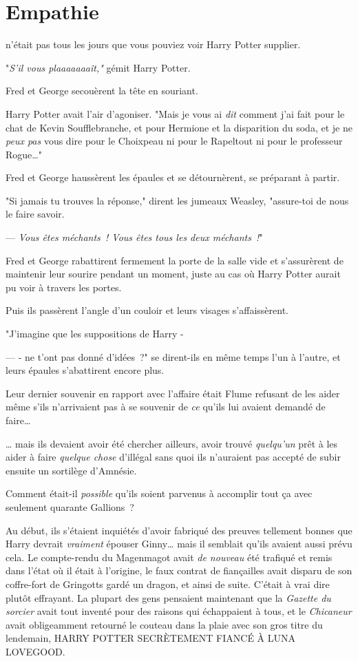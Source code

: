 \chapter{Empathie}

 n'était pas tous les jours que vous pouviez voir Harry Potter supplier.

\hplettrineextrapara
"\emph{S'il vous plaaaaaaaît,"} gémit Harry Potter.

Fred et George secouèrent la tête en souriant.

Harry Potter avait l'air d'agoniser. "Mais je vous ai \emph{dit} comment j'ai fait pour le chat de Kevin Soufflebranche, et pour Hermione et la disparition du soda, et je ne \emph{peux pas} vous dire pour le Choixpeau ni pour le Rapeltout ni pour le professeur Rogue…"

Fred et George haussèrent les épaules et se détournèrent, se préparant à partir.

"Si jamais tu trouves la réponse," dirent les jumeaux Weasley, "assure-toi de nous le faire savoir.

--- \emph{Vous êtes méchants~! Vous êtes tous les deux méchants~!}"

Fred et George rabattirent fermement la porte de la salle vide et s'assurèrent de maintenir leur sourire pendant un moment, juste au cas où Harry Potter aurait pu voir à travers les portes.

Puis ils passèrent l'angle d'un couloir et leurs visages s'affaissèrent.

"J'imagine que les suppositions de Harry -

--- - ne t'ont pas donné d'idées~?" se dirent-ils en même temps l'un à l'autre, et leurs épaules s'abattirent encore plus.

Leur dernier souvenir en rapport avec l'affaire était Flume refusant de les aider même s'ils n'arrivaient pas à se souvenir de \emph{ce} qu'ils lui avaient demandé de faire…

… mais ils devaient avoir été chercher ailleurs, avoir trouvé \emph{quelqu'un} prêt à les aider à faire \emph{quelque chose} d'illégal sans quoi ils n'auraient pas accepté de subir ensuite un sortilège d'Amnésie.

Comment était-il \emph{possible} qu'ils soient parvenus à accomplir tout ça avec seulement quarante Gallions~?

Au début, ils s'étaient inquiétés d'avoir fabriqué des preuves tellement bonnes que Harry devrait \emph{vraiment} épouser Ginny… mais il semblait qu'ils avaient aussi prévu cela. Le compte-rendu du Magenmagot avait \emph{de nouveau} été trafiqué et remis dans l'état où il était à l'origine, le faux contrat de fiançailles avait disparu de son coffre-fort de Gringotts gardé un dragon, et ainsi de suite. C'était à vrai dire plutôt effrayant. La plupart des gens pensaient maintenant que la \emph{Gazette du sorcier} avait tout inventé pour des raisons qui échappaient à tous, et le \emph{Chicaneur} avait obligeamment retourné le couteau dans la plaie avec son gros titre du lendemain, HARRY POTTER SECRÈTEMENT FIANCÉ À LUNA LOVEGOOD.

